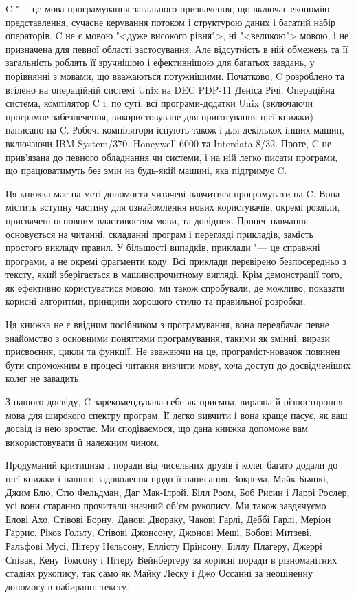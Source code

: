 \documentclass[a4paper,12pt]{book}
\begin{document}
  C "--- це мова програмування загального призначення, що включає економію
  представлення, сучасне керування потоком і структурою даних і багатий набір операторів.
  C не є мовою "<дуже високого рівня">, ні "<великою"> мовою, і не
  призначена для певної області застосування. Але відсутність в ній обмежень та її
  загальність роблять її зручнішою і ефективнішою для багатьох завдань, у порівнянні з
  мовами, що вважаються потужнішими. Початково, C розроблено та втілено на операційній
  системі Unix на DEC PDP-11 Деніса Річі. Операційна система, компілятор C і, по суті,
  всі програми-додатки Unix (включаючи програмне забезпечення, використовуване для
  приготування цієї книжки) написано на C. Робочі компілятори існують також і для
  декількох інших машин, включаючи IBM System/370, Honeywell 6000 та Interdata 8/32.
  Проте, C не прив'язана до певного обладнання чи системи, і на ній легко писати програми,
  що працюватимуть без змін на будь-якій машині, яка підтримує C.

  Ця книжка має на меті допомогти читачеві навчитися програмувати на C. Вона містить
  вступну частину для ознайомлення нових користувачів, окремі розділи, присвячені
  основним властивостям мови, та довідник. Процес навчання основується на читанні,
  складанні програм і перегляді прикладів, замість простого викладу правил. У більшості
  випадків, приклади "--- це справжні програми, а не окремі фрагменти коду. Всі приклади
  перевірено безпосередньо з тексту, який зберігається в машинопрочитному вигляді. Крім
  демонстрації того, як ефективно користуватися мовою, ми також спробували, де можливо,
  показати корисні алгоритми, принципи хорошого стилю та правильної розробки.

  Ця книжка не є ввідним посібником з програмування, вона передбачає певне знайомство
  з основними поняттями програмування, такими як змінні, вирази присвоєння, цикли та
  функції. Не зважаючи на це, програміст-новачок повинен бути спроможним в процесі
  читання вивчити мову, хоча доступ до досвідченіших колег не завадить.

  З нашого досвіду, C зарекомендувала себе як приємна, виразна й різностороння мова
  для широкого спектру програм. Її легко вивчити і вона краще пасує, як ваш досвід із нею
  зростає. Ми сподіваємося, що дана книжка допоможе вам використовувати її належним
  чином.

  Продуманий критицизм і поради від чисельних друзів і колег багато додали до цієї
  книжки і нашого задоволення щодо її написання. Зокрема, Майк Бьянкі, Джим Блю, Стю
  Фельдман, Даг Мак-Ілрой, Білл Роом, Боб Рисин і Ларрі Рослер, усі вони старанно
  прочитали значний об'єм рукопису. Ми також завдячуємо Елові Ахо, Стівові Борну,
  Данові Двораку, Чакові Гарлі, Деббі Гарлі, Меріон Гаррис, Ріков Гольту, Стівові
  Джонсону, Джонові Меші, Бобові Митзеві, Ральфові Мусі, Пітеру Нельсону, Елліоту
  Прінсону, Біллу Плагеру, Джеррі Співак, Кену Томсону і Пітеру Вейнбергеру за корисні
  поради в різноманітних стадіях рукопису, так само як Майку Леску і Джо Оссанні за
  неоціненну допомогу в набиранні тексту.
\end{document}
